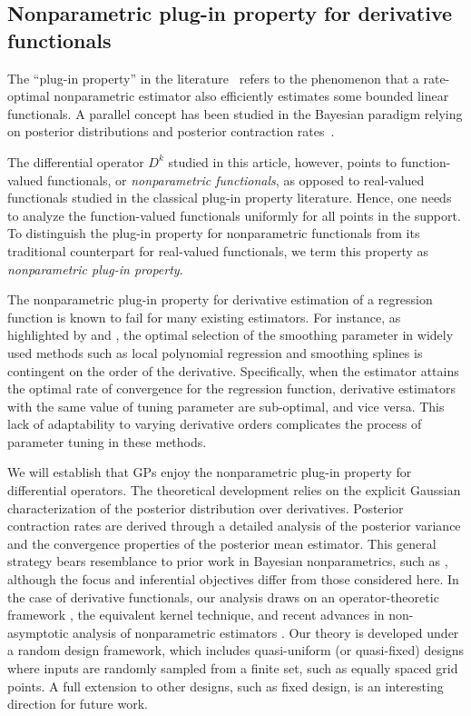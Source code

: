\documentclass[12pt]{article}
\theoremstyle{plain}
\theoremstyle{nonitalicremark}
\begin{document}
\subsection{Nonparametric plug-in property for derivative functionals} 
\label{sec:plug.in.challenge}


The ``plug-in property'' in the literature~\citep{bickel2003nonparametric} refers to the phenomenon that a rate-optimal nonparametric estimator also efficiently estimates some bounded linear functionals. A parallel concept has been studied in the Bayesian paradigm relying on posterior distributions and posterior contraction rates~\citep{rivoirard2012bernstein, castillo2013nonparametric, castillo2015bernstein}. 

The differential operator $D^k$ studied in this article, however, points to function-valued functionals, or \textit{nonparametric functionals}, as opposed to real-valued functionals studied in the classical plug-in property literature. Hence, one needs to analyze the function-valued functionals uniformly for all points in the support. To distinguish the plug-in property for nonparametric functionals from its traditional counterpart for real-valued functionals, we term this property as \textit{nonparametric plug-in property}. 

The nonparametric plug-in property for derivative estimation of a regression function is known to fail for many existing estimators. For instance, as highlighted by \cite{wahba1990optimal} and \cite{charnigo2011generalized}, the optimal selection of the smoothing parameter in widely used methods such as local polynomial regression and smoothing splines is contingent on the order of the derivative. Specifically, when the estimator attains the optimal rate of convergence for the regression function, derivative estimators with the same value of tuning parameter are sub-optimal, and vice versa. This lack of adaptability to varying derivative orders complicates the process of parameter tuning in these methods.

We will establish that GPs enjoy the nonparametric plug-in property for differential operators. The theoretical development relies on the explicit Gaussian characterization of the posterior distribution over derivatives. Posterior contraction rates are derived through a detailed analysis of the posterior variance and the convergence properties of the posterior mean estimator. This general strategy bears resemblance to prior work in Bayesian nonparametrics, such as \cite{knapik2011bayesian}, although the focus and inferential objectives differ from those considered here. In the case of derivative functionals, our analysis draws on an operator-theoretic framework \citep{smale2005shannon,smale2007learning}, the equivalent kernel technique, and recent advances in non-asymptotic analysis of nonparametric estimators \citep{liu2020non}. Our theory is developed under a random design framework, which includes quasi-uniform (or quasi-fixed) designs where inputs are randomly sampled from a finite set, such as equally spaced grid points. A full extension to other designs, such as fixed design, is an interesting direction for future work.
\end{document}

